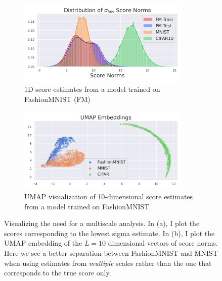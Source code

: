 \begin{figure}[tbhp]
\small
\label{fig:scores}
\centering
\begin{subfigure}[b]{\textwidth}
    \centering
    \includegraphics[width=0.9\textwidth]{figures/low_sigma_FvM_tight.png}
    \caption{1D score estimates from a model trained on FashionMNIST (FM)}
    \label{fig:score_norms}
\end{subfigure}
\hfill
\begin{subfigure}[b]{\textwidth}
    \centering
    \includegraphics[width=0.9\textwidth]{figures/umap_fashion_tight.png}
    \caption{UMAP visualization of 10-dimensional score estimates from a model trained on FashionMNIST}
    \label{fig:umap}
\end{subfigure}

\caption{Visualizing the need for a multiscale analysis. In (a), I plot the scores corresponding to the lowest sigma estimate. In (b), I plot the UMAP embedding of the $L=10$ dimensional vectors of score norms. Here we see a better separation between FashionMNIST and MNIST when using estimates from \textit{multiple} scales rather than the one that corresponds to the true score only.}
\end{figure}


